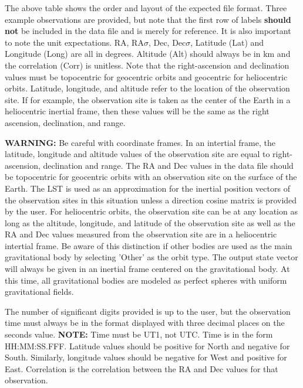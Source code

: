\documentclass{article}
\begin{document}
				The above table shows the order and layout of the expected file format. Three example observations are provided, but note that the first row of labels \textbf{should not} be included in the data 	 	
				file and is merely for reference. It is also important to note 
				the unit expectations. RA, RA$\sigma$, Dec, Dec$\sigma$, Latitude (Lat) and Longitude (Long) are all in degrees. Altitude (Alt) should always be in km and the correlation (Corr) is unitless. 
				Note that the right-ascension and declination values must be topocentric for geocentric orbits and geocentric for heliocentric orbits. Latitude, longitude, and altitude refer to the location of the 
				observation site. If for example, the observation site is taken as the center of the Earth in a heliocentric inertial frame, then these values will be the same as the right ascension, declination, and range. \par
				\textbf{WARNING:} Be careful with coordinate frames. In an intertial frame, the latitude, longitude and altitude values of the observation site are equal to right-ascension, declination and range. The RA and Dec values in the data file should be topocentric 
				for geocentric orbits with an observation site on the surface of the Earth. The LST is used as an approximation for the inertial position vectors of the observation sites in this situation unless a direction cosine matrix is provided by the user. For heliocentric orbits, the observation site can be at any location as 
				long as the altitude, longitude, and latitude of the observation site as well as the RA and Dec values measured from the observation site are in a heliocentric intertial frame.
				 Be aware of this distinction if other bodies are used as the main gravitational body by selecting 'Other' as the orbit type.  The output state vector will always be given in an inertial frame centered on the gravitational body. At this time, all gravitational bodies are modeled as perfect spheres with uniform gravitational fields. \par

				The number of significant digits provided is up to the user, but the observation time must always be in the format displayed with three decimal places on the seconds value. \textbf{NOTE:} Time  	 		
				must be UT1, not UTC. Time is in the form HH:MM:SS.FFF. 
				Latitude values should be positive for North and negative for South. Similarly, longitude values should be negative for West and positive for East. Correlation is the correlation between the RA and 		 	
				Dec values for that observation. \par
\end{document}
